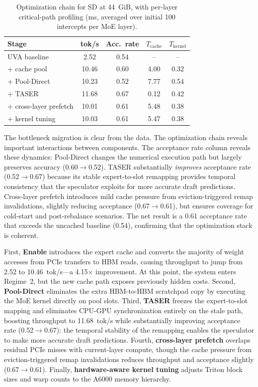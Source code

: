 \begin{table}[t]
\caption{Optimization chain for SD at 44~GiB, with per-layer critical-path profiling (ms, averaged over initial 100 intercepts per MoE layer).}
\label{tab:ablation}
\centering
\small
\setlength{\tabcolsep}{3.5pt}
\begin{tabular}{lcccc}
\toprule
Stage & tok/s & Acc.\ rate & $T_{\mathrm{cache}}$ & $T_{\mathrm{kernel}}$ \\
\midrule
UVA baseline & 2.52 & 0.54 & -- & -- \\
+ cache pool & 10.46 & 0.60 & 4.00 & 0.32 \\
+ Pool-Direct & 10.23 & 0.52 & 7.77 & 0.54 \\
+ TASER & 11.68 & 0.67 & 0.12 & 0.42 \\
+ cross-layer prefetch & 10.01 & 0.61 & 5.48 & 0.38 \\
+ kernel tuning & 10.03 & 0.61 & 5.47 & 0.38 \\
\bottomrule
\end{tabular}
\end{table}

The bottleneck migration is clear from the data. The optimization chain reveals important interactions between components. The acceptance rate column reveals these dynamics: Pool-Direct changes the numerical execution path but largely preserves accuracy (0.60$\to$0.52). TASER substantially \emph{improves} acceptance rate (0.52$\to$0.67) because its stable expert-to-slot remapping provides temporal consistency that the speculator exploits for more accurate draft predictions. Cross-layer prefetch introduces mild cache pressure from eviction-triggered remap invalidations, slightly reducing acceptance (0.67$\to$0.61), but ensures coverage for cold-start and post-rebalance scenarios. The net result is a 0.61 acceptance rate that exceeds the uncached baseline (0.54), confirming that the optimization stack is coherent.

First, \textbf{Enable} introduces the expert cache and converts the majority of weight accesses from PCIe transfers to HBM reads, causing throughput to jump from 2.52 to 10.46~tok/s---a 4.15$\times$ improvement. At this point, the system enters Regime~2, but the new cache path exposes previously hidden costs. Second, \textbf{Pool-Direct} eliminates the extra HBM-to-HBM scratchpad copy by executing the MoE kernel directly on pool slots. Third, \textbf{TASER} freezes the expert-to-slot mapping and eliminates CPU-GPU synchronization entirely on the stale path, boosting throughput to 11.68~tok/s while substantially improving acceptance rate (0.52$\to$0.67): the temporal stability of the remapping enables the speculator to make more accurate draft predictions. Fourth, \textbf{cross-layer prefetch} overlaps residual PCIe misses with current-layer compute, though the cache pressure from eviction-triggered remap invalidations reduces throughput and acceptance slightly (0.67$\to$0.61). Finally, \textbf{hardware-aware kernel tuning} adjusts Triton block sizes and warp counts to the A6000 memory hierarchy.

